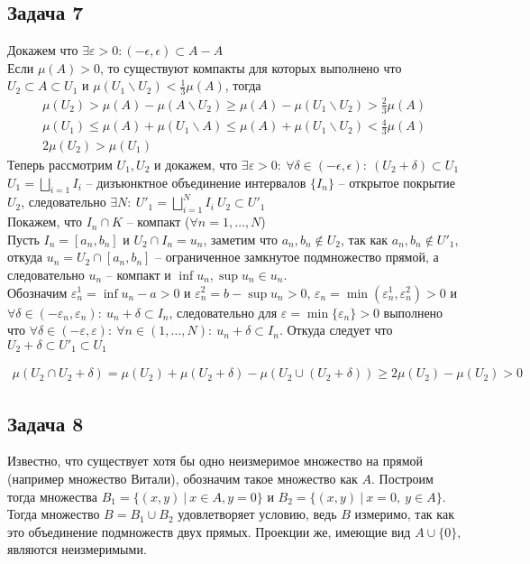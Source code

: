 \subsection*{Задача 7}
	Докажем что $\exists \varepsilon > 0: (-\epsilon, \epsilon) \subset A - A$\\
	Если $\mu(A) > 0$, то существуют компакты для которых выполнено что $U_2 \subset A \subset U_1$ и $\mu(U_1 \backslash U_2) < \frac{1}{3}\mu(A)$, тогда
	\begin{gather*}
		\mu(U_2) > \mu(A) - \mu(A \backslash U_2) \geqslant \mu(A) - \mu(U_1 \backslash U_2) > \frac{2}{3} \mu(A)\\
		\mu(U_1) \leqslant \mu(A) + \mu(U_1 \backslash A) \leqslant \mu(A) + \mu(U_1 \backslash U_2) < \frac{4}{3} \mu(A)\\
		2\mu(U_2) > \mu(U_1)
	\end{gather*}
	\vskip 0.2in
	Теперь рассмотрим $U_1, U_2$ и докажем, что $\exists \varepsilon > 0:\ \forall \delta \in (-\epsilon, \epsilon):\ (U_2 + \delta) \subset U_1$\\
	$U_1 = \bigsqcup\limits_{i=1} I_i$ -- дизъюнктное объединение интервалов $\{I_n\}$ -- открытое покрытие $U_2$, следовательно $\exists N:\ U'_1 = \bigsqcup\limits_{i=1}^{N} I_i\ U_2 \subset U'_1$\\
	Покажем, что $I_n \cap K$ -- компакт ($\forall n = 1,\ldots,N$)\\
	Пусть $I_n = [a_n, b_n]$ и $U_2 \cap I_n = u_n$, заметим что $a_n,b_n \notin U_2$, так как $a_n,b_n \notin U'_1$, откуда $u_n = U_2 \cap [a_n, b_n]$ -- ограниченное замкнутое подмножество прямой, а следовательно $u_n$ -- компакт и $\inf u_n, \sup u_n \in u_n$.\\
	Обозначим $\varepsilon_n^{1} = \inf u_n - a > 0$ и $\varepsilon_n^{2} = b - \sup u_n > 0$, $\varepsilon_n = \min (\varepsilon_n^{1}, \varepsilon_n^{2}) > 0$ и $\forall \delta \in (-\varepsilon_n, \varepsilon_n):\ u_n + \delta \subset I_n$, следовательно для $\varepsilon = \min \{\varepsilon_n\} > 0$ выполнено что $\forall \delta \in (-\varepsilon, \varepsilon):\ \forall n \in (1,\ldots,N):\ u_n + \delta \subset I_n$. Откуда следует что $U_2 + \delta \subset U'_1 \subset U_1$
	
	\begin{gather*}
		\mu(U_2 \cap U_2 + \delta) = \mu(U_2) + \mu(U_2 + \delta) - \mu(U_2 \cup (U_2 + \delta)) \geqslant 2\mu(U_2) - \mu(U_2) > 0
	\end{gather*}



\subsection*{Задача 8}
	Известно, что существует хотя бы одно неизмеримое множество на прямой (например множество Витали), обозначим такое множество как $A$. Построим тогда множества $B_1 = \{(x,y)\ |\ x \in A, y = 0\}$ и $B_2 = \{(x,y)\ |\ x = 0,\ y \in A \}$. Тогда множество $B = B_1 \cup B_2$ удовлетворяет условию, ведь $B$ измеримо, так как это объединение подмножеств двух прямых. Проекции же, имеющие вид $A \cup \{0\}$, являются неизмеримыми.


